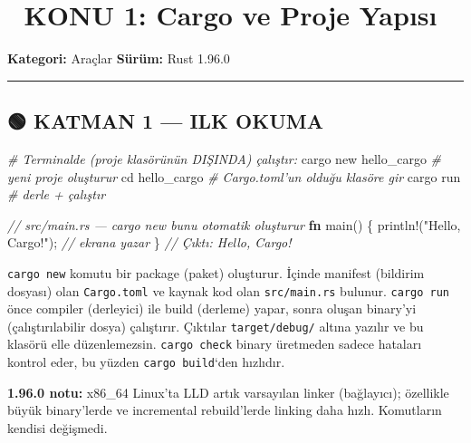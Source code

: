\documentclass[12pt,a4paper]{article}
\date{\today}
\newenvironment{Shaded}{}{}
\newcommand{\BuiltInTok}[1]{\textcolor[rgb]{0.00,0.50,0.00}{#1}}
\newcommand{\CommentTok}[1]{\textcolor[rgb]{0.38,0.63,0.69}{\textit{#1}}}
\newcommand{\FunctionTok}[1]{\textcolor[rgb]{0.02,0.16,0.49}{#1}}
\newcommand{\KeywordTok}[1]{\textcolor[rgb]{0.00,0.44,0.13}{\textbf{#1}}}
\newcommand{\NormalTok}[1]{#1}
\newcommand{\OperatorTok}[1]{\textcolor[rgb]{0.40,0.40,0.40}{#1}}
\newcommand{\StringTok}[1]{\textcolor[rgb]{0.25,0.44,0.63}{#1}}
\begin{document}
\section{📘 KONU 1: Cargo ve Proje Yapısı}\label{konu-1-cargo-ve-proje-yapısı}

\textbf{Kategori:} Araçlar \textbar{} \textbf{Sürüm:} Rust 1.96.0

\begin{center}\rule{0.5\linewidth}{0.5pt}\end{center}

\subsection{🟢 KATMAN 1 --- ILK OKUMA}\label{katman-1-—-ilk-okuma}

\begin{Shaded}
\begin{Highlighting}[]
\CommentTok{\# Terminalde (proje klasörünün DIŞINDA) çalıştır:}
\NormalTok{cargo new hello\_cargo     }\CommentTok{\# yeni proje oluşturur}
\BuiltInTok{cd}\NormalTok{ hello\_cargo            }\CommentTok{\# Cargo.toml'un olduğu klasöre gir}
\NormalTok{cargo run                 }\CommentTok{\# derle + çalıştır}
\end{Highlighting}
\end{Shaded}

\begin{Shaded}
\begin{Highlighting}[]
\CommentTok{// src/main.rs — cargo new bunu otomatik oluşturur}
\KeywordTok{fn} \FunctionTok{main}\OperatorTok{()} \OperatorTok{\{}
\NormalTok{    println}\OperatorTok{!(}\StringTok{"Hello, Cargo!"}\OperatorTok{);}   \CommentTok{// ekrana yazar}
\OperatorTok{\}}
\CommentTok{// Çıktı: Hello, Cargo!}
\end{Highlighting}
\end{Shaded}

\texttt{cargo\ new} komutu bir package (paket) oluşturur. İçinde manifest (bildirim dosyası) olan \texttt{Cargo.toml} ve kaynak kod olan \texttt{src/main.rs} bulunur. \texttt{cargo\ run} önce compiler (derleyici) ile build (derleme) yapar, sonra oluşan binary'yi (çalıştırılabilir dosya) çalıştırır. Çıktılar \texttt{target/debug/} altına yazılır ve bu klasörü elle düzenlemezsin. \texttt{cargo\ check} binary üretmeden sadece hataları kontrol eder, bu yüzden \texttt{cargo\ build}`den hızlıdır.

\textbf{1.96.0 notu:} x86\_64 Linux'ta LLD artık varsayılan linker (bağlayıcı); özellikle büyük binary'lerde ve incremental rebuild'lerde linking daha hızlı. Komutların kendisi değişmedi.
\end{document}
